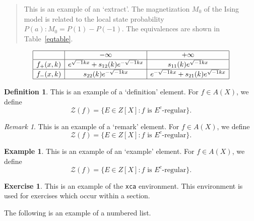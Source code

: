 \documentclass{amsart}
\theoremstyle{definition}
\newtheorem{definition}[theorem]{Definition}
\newtheorem{example}[theorem]{Example}
\newtheorem{xca}[theorem]{Exercise}
\theoremstyle{remark}
\newtheorem{remark}[theorem]{Remark}
\numberwithin{equation}{section}
\begin{document}
\begin{quotation}
This is an example of an `extract'. The magnetization $M_0$ of the Ising
model is related to the local state probability $P(a):M_0=P(1)-P(-1)$.
The equivalences are shown in Table~\ref{eqtable}.
\end{quotation}

\begin{table}[ht]
\caption{}\label{eqtable}
\renewcommand\arraystretch{1.5}
\noindent\[
\begin{array}{|c|c|c|}
\hline
&{-\infty}&{+\infty}\\
\hline
{f_+(x,k)}&e^{\sqrt{-1}kx}+s_{12}(k)e^{-\sqrt{-1}kx}&s_{11}(k)e^
{\sqrt{-1}kx}\\
\hline
{f_-(x,k)}&s_{22}(k)e^{-\sqrt{-1}kx}&e^{-\sqrt{-1}kx}+s_{21}(k)e^{\sqrt
{-1}kx}\\
\hline
\end{array}
\]
\end{table}

\begin{definition}
This is an example of a `definition' element.
For $f\in A(X)$, we define
\begin{equation}
\mathcal{Z} (f)=\{E\in Z[X]: \text{$f$ is $E^c$-regular}\}.
\end{equation}
\end{definition}

\begin{remark}
This is an example of a `remark' element.
For $f\in A(X)$, we define
\begin{equation}
\mathcal{Z} (f)=\{E\in Z[X]: \text{$f$ is $E^c$-regular}\}.
\end{equation}
\end{remark}

\begin{example}
This is an example of an `example' element.
For $f\in A(X)$, we define
\begin{equation}
\mathcal{Z} (f)=\{E\in Z[X]: \text{$f$ is $E^c$-regular}\}.
\end{equation}
\end{example}

\begin{xca}
This is an example of the \texttt{xca} environment. This environment is
used for exercises which occur within a section.
\end{xca}

The following is an example of a numbered list.
\end{document}
